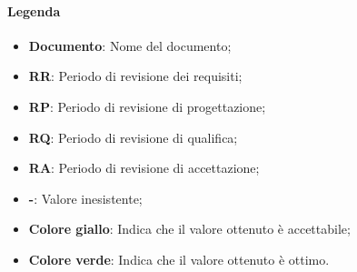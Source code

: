\paragraph{Legenda}
\begin{itemize}
	\item \textbf{Documento}: Nome del documento;
	\item \textbf{RR}: Periodo di revisione dei requisiti;
	\item \textbf{RP}: Periodo di revisione di progettazione;
	\item \textbf{RQ}: Periodo di revisione di qualifica;
	\item \textbf{RA}: Periodo di revisione di accettazione;
	\item \textbf{-}: Valore inesistente;
	\item  \textbf{Colore giallo}: Indica che il valore ottenuto è accettabile;
	\item  \textbf{Colore verde}: Indica che il valore ottenuto è ottimo. 
\end{itemize}
\newpage
